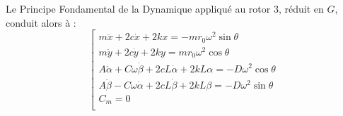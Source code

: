 \begin{multicols}{2}
Le Principe Fondamental de la Dynamique appliqué au rotor 3, réduit en $G$,
conduit alors à :
$$
\left[
\begin{array}{l}
m\ddot{x}+2c\dot{x}+2kx =-mr_0\omega^2 \sin \theta \\
m\ddot{y}+2c\dot{y}+2ky = mr_0\omega^2 \cos \theta \\
A\ddot{\alpha}+C\omega \dot{\beta }+2cL\dot{\alpha}+2kL\alpha =-D\omega^2 \cos \theta \\
A\ddot{\beta} - C\omega \dot{\alpha}+2cL\dot{\beta}+2kL\beta =-D\omega^2 \sin \theta \\
C_m=0 \\
\end{array}
\right.
$$

%
%



\ifprof
\else
\end{multicols}
\fi

